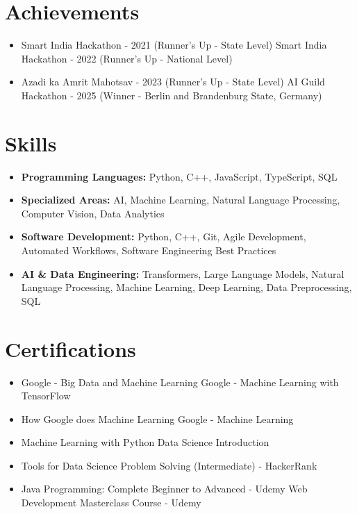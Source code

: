 \documentclass[a4paper,10pt]{article}
\begin{document}
\section*{Achievements}
\begin{itemize}
\item Smart India Hackathon - 2021 (Runner's Up - State Level) \hfill Smart India Hackathon - 2022 (Runner's Up - National Level)
\item Azadi ka Amrit Mahotsav - 2023 (Runner's Up - State Level) \hfill AI Guild Hackathon - 2025 (Winner - Berlin and Brandenburg State, Germany)
\end{itemize}

\section*{Skills}
\begin{itemize}
  \item \textbf{Programming Languages:} Python, C++, JavaScript, TypeScript, SQL
  \item \textbf{Specialized Areas:} AI, Machine Learning, Natural Language Processing, Computer Vision, Data Analytics
  \item \textbf{Software Development:} Python, C++, Git, Agile Development, Automated Workflows, Software Engineering Best Practices
  \item \textbf{AI \& Data Engineering:} Transformers, Large Language Models, Natural Language Processing, Machine Learning, Deep Learning, Data Preprocessing, SQL
\end{itemize}

\section*{Certifications}
\begin{itemize}
\item Google - Big Data and Machine Learning \hfill Google - Machine Learning with TensorFlow
\item How Google does Machine Learning \hfill Google - Machine Learning
\item Machine Learning with Python \hfill Data Science Introduction
\item Tools for Data Science \hfill Problem Solving (Intermediate) - HackerRank
\item Java Programming: Complete Beginner to Advanced - Udemy \hfill Web Development Masterclass Course - Udemy
\end{itemize}
\end{document}
